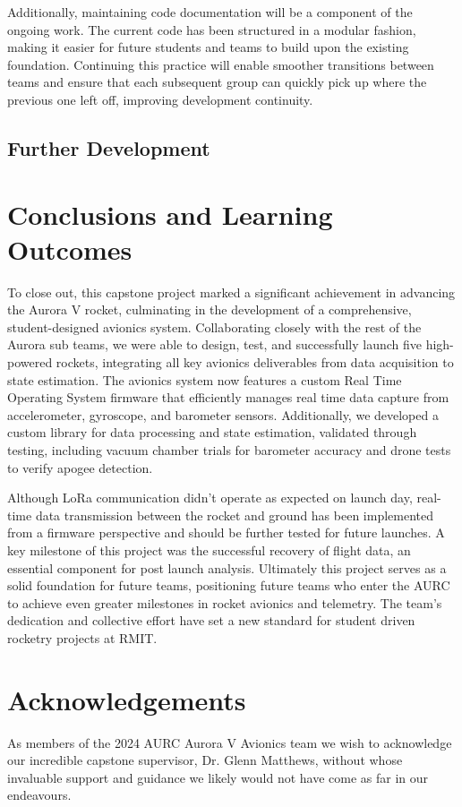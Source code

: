 Additionally, maintaining code documentation will be a component of the ongoing work. The current code has been structured in a modular fashion, making it easier for future students and teams to build upon the existing foundation. Continuing this practice will enable smoother transitions between teams and ensure that each subsequent group can quickly pick up where the previous one left off, improving development continuity.

\subsection{Further Development}

\section{Conclusions and Learning Outcomes}
To close out, this capstone project marked a significant achievement in advancing the Aurora V rocket, culminating in the development of a comprehensive, student-designed avionics system. Collaborating closely with the rest of the Aurora sub teams, we were able to design, test, and successfully launch five high-powered rockets, integrating all key avionics deliverables from data acquisition to state estimation. The avionics system now features a custom Real Time Operating System firmware that efficiently manages real time data capture from accelerometer, gyroscope, and barometer sensors. Additionally, we developed a custom library for data processing and state estimation, validated through testing, including vacuum chamber trials for barometer accuracy and drone tests to verify apogee detection. 

Although LoRa communication didn’t operate as expected on launch day, real-time data transmission between the rocket and ground has been implemented from a firmware perspective and should be further tested for future launches. A key milestone of this project was the successful recovery of flight data, an essential component for post launch analysis. Ultimately this project serves as a solid foundation for future teams, positioning future teams who enter the AURC to achieve even greater milestones in rocket avionics and telemetry. The team's dedication and collective effort have set a new standard for student driven rocketry projects at RMIT. 

\section{Acknowledgements}
As members of the 2024 AURC Aurora V Avionics team we wish to acknowledge our incredible capstone supervisor, Dr. Glenn Matthews, without whose invaluable support and guidance we likely would not have come as far in our endeavours. 

